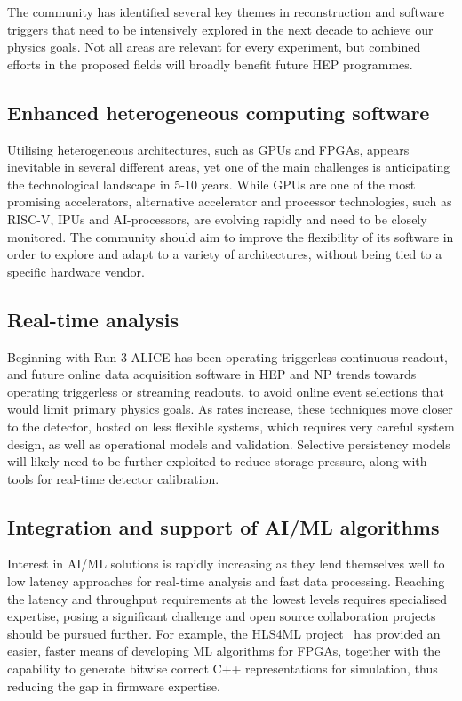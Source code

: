 \documentclass[10pt,a4paper]{article}
\begin{document}
The community has identified several key themes in reconstruction and software
triggers that need to be intensively explored in the next decade to achieve our
physics goals. Not all areas are relevant for every experiment, but combined
efforts in the proposed fields will broadly benefit future HEP programmes.

\subsection{Enhanced heterogeneous computing
software}\label{enhanced-heterogeneous-computing-software}

Utilising heterogeneous architectures, such as GPUs and FPGAs, appears
inevitable in several different areas, yet one of the main challenges is
anticipating the technological landscape in 5-10 years. While GPUs are one of
the most promising accelerators, alternative accelerator and processor
technologies, such as RISC-V, IPUs and AI-processors, are evolving rapidly and
need to be closely monitored. The community should aim to improve the
flexibility of its software in order to explore and adapt to a variety of
architectures, without being tied to a specific hardware vendor.

\subsection{Real-time analysis}\label{real-time-analysis}

Beginning with Run 3 ALICE has been operating triggerless continuous readout,
and future online data acquisition software in HEP and NP trends towards operating
triggerless or streaming readouts, to avoid online event selections that would
limit primary physics goals. As rates increase, these techniques move closer
to the detector, hosted on less flexible systems, which requires very careful
system design, as well as operational models and validation. Selective
persistency models will likely need to be further exploited to reduce storage
pressure, along with tools for real-time detector calibration.

\subsection{Integration and support of AI/ML
algorithms}\label{integration-and-support-of-aiml-algorithms}

Interest in AI/ML solutions is rapidly increasing as they lend themselves well
to low latency approaches for real-time analysis and fast data processing.
Reaching the latency and throughput requirements at the lowest levels requires
specialised expertise, posing a significant challenge and open source
collaboration projects should be pursued further. For example, the HLS4ML
project~\cite{fastml_hls4ml,Duarte:2018ite} has provided an
easier, faster means of developing ML algorithms for FPGAs, together with the
capability to generate bitwise correct C++ representations for simulation,
thus reducing the gap in firmware expertise.
\end{document}
